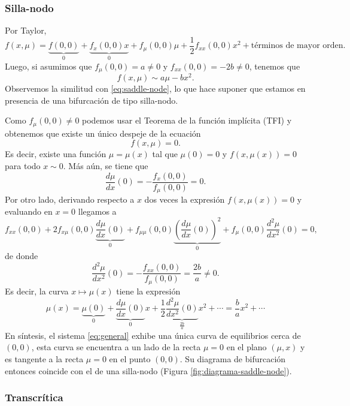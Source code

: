 \documentclass[12pt, a4paper]{amsbook}
\theoremstyle{remark}
\theoremstyle{definition}
\numberwithin{section}{chapter}
\numberwithin{subsection}{section}
\numberwithin{equation}{section}
\numberwithin{figure}{chapter}
\begin{document}
\subsubsection*{Silla-nodo}
Por Taylor,
$$
f(x,\mu) = \underbrace{f(0,0)}_{0} + \underbrace{f_x(0,0) x}_{0} + f_\mu(0,0)\mu + \frac12 f_{xx}(0,0) x^2 + \text{términos de mayor orden}.
$$
Luego, si asumimos que $f_\mu(0,0)=a\neq0$ y $f_{xx}(0,0)=-2b\neq 0$, tenemos que
$$
f(x, \mu) \sim a\mu - bx^2.
$$
Observemos la similitud con \eqref{eq:saddle-node}, lo que hace suponer que estamos en presencia de una bifurcación de tipo silla-nodo.

Como $f_\mu(0,0)\neq 0$ podemos usar el Teorema de la función implícita (TFI) y obtenemos que existe un único despeje de la ecuación
$$
f(x,\mu)=0.
$$
Es decir, existe una función $\mu=\mu(x)$ tal que $\mu(0)=0$ y $f(x,\mu(x))=0$ para todo $x\sim 0$. Más aún, se tiene que
$$
\frac{d\mu}{dx}(0) = -\frac{f_x(0,0)}{f_\mu(0,0)} = 0.
$$
Por otro lado, derivando respecto a $x$ dos veces la expresión $f(x,\mu(x))=0$ y evaluando en $x=0$ llegamos a
$$
f_{xx}(0,0) + 2f_{x\mu}(0,0)\underbrace{\frac{d\mu}{dx}(0)}_{0} + f_{\mu\mu}(0,0) \underbrace{\left(\frac{d\mu}{dx}(0)\right)^2}_{0} + f_\mu(0,0)\frac{d^2\mu}{dx^2}(0) = 0,
$$
de donde
$$
\frac{d^2\mu}{dx^2}(0) = -\frac{f_{xx}(0,0)}{f_\mu(0,0)} = \frac{2b}{a} \neq 0.
$$
Es decir, la curva $x\mapsto \mu(x)$ tiene la expresión
$$
\mu(x) = \underbrace{\mu(0)}_{0} + \underbrace{\frac{d\mu}{dx}(0)}_{0} x + \frac12 \underbrace{\frac{d^2\mu}{dx^2}(0)}_{\frac{2b}{a}} x^2 +\cdots = \frac{b}{a}x^2 + \cdots
$$
En síntesis, el sistema \eqref{eq:general} exhibe una única curva de equilibrios cerca de $(0,0)$, esta curva se encuentra a un lado de la recta $\mu=0$ en el plano $(\mu, x)$ y es tangente a la recta $\mu=0$ en el punto $(0,0)$. Su diagrama de bifurcación entonces coincide con el de una silla-nodo (Figura \ref{fig:diagrama-saddle-node}).

\subsubsection*{Transcrítica}
\end{document}
